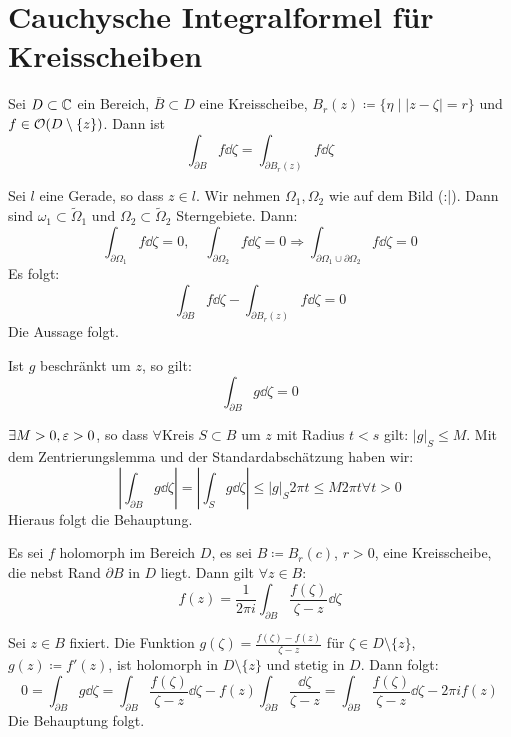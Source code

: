 \section{Cauchysche Integralformel f\"ur Kreisscheiben}
\begin{lemma}[Zentrierungslemma]
Sei $ D\subset\mathbb{C} $ ein Bereich, $ \bar B\subset D $ eine Kreisscheibe, $ B_r(z)\coloneqq\lbrace\eta\mid |z-\zeta|=r\rbrace $ und $ f\in\mathcal O(D\setminus\lbrace z\rbrace) $. Dann ist
\[ \int_{\partial B}^{} f\dd\zeta=\int_{\partial B_r(z)}^{} f\dd\zeta \]
\end{lemma}
\begin{beweis}
Sei $ l $ eine Gerade, so dass $ z\in l $. Wir nehmen $ \Omega_1,\Omega_2 $ wie auf dem Bild (:|). Dann sind $\omega_1\subset\tilde \Omega_1 $ und $ \Omega_2\subset\tilde{\Omega}_2 $ Sterngebiete.
Dann:
\[ \int_{\partial\Omega_1}^{} f\dd\zeta=0,\quad\int_{\partial\Omega_2}^{} f\dd\zeta = 0\Rightarrow\int_{\partial\Omega_1\cup\partial\Omega_2}^{} f\dd\zeta = 0 \]
Es folgt:
\[ \int_{\partial B}^{} f\dd\zeta - \int_{\partial B_r(z)}^{} f\dd\zeta = 0 \]
Die Aussage folgt.
\end{beweis}
\begin{korollar}
	Ist $ g $ beschr\"ankt um $ z $, so gilt:
	\[ \int_{\partial B}g\dd\zeta=0 \]
\end{korollar}
\begin{beweis}
	$ \exists M>0,\varepsilon>0 $, so dass $ \forall $Kreis $ S\subset B $ um $ z $ mit Radius $ t<s $ gilt: $ |g|_S\leq M $. Mit dem Zentrierungslemma und der Standardabsch\"atzung haben wir:
	\[ \left|\int_{\partial B}^{} g\dd\zeta\right|=\left|\int_S g\dd\zeta\right|\leq|g|_S2\pi t\leq M2\pi t\forall t>0 \]
	Hieraus folgt die Behauptung.
\end{beweis}
\newpage
\begin{satz}
	Es sei $ f $ holomorph im Bereich $ D $, es sei $ B\coloneqq B_r(c) $, $ r>0 $, eine Kreisscheibe, die nebst Rand $ \partial B $ in $ D $ liegt. Dann gilt $ \forall z\in B $:
	\[ f(z)=\frac{1}{2\pi i}\int_{\partial B}^{}\frac{f(\zeta)}{\zeta-z}\dd\zeta \]
\end{satz}
\begin{beweis}
	Sei $ z\in B $ fixiert. Die Funktion $ g(\zeta)=\frac{f(\zeta)-f(z)}{\zeta-z} $ f\"ur $ \zeta\in D\setminus\lbrace z\rbrace $, $ g(z)\coloneqq f'(z) $, ist holomorph in $ D\setminus\lbrace z\rbrace $ und stetig in $ D $. Dann folgt:
	\[ 0=\int_{\partial B}^{}g\dd\zeta=\int_{\partial B}^{}\frac{f(\zeta)}{\zeta-z}\dd\zeta-f(z)\int_{\partial B}^{}\frac{\dd\zeta}{\zeta-z}=\int_{\partial B}^{}\frac{f(\zeta)}{\zeta-z}\dd\zeta-2\pi if(z) \]
	Die Behauptung folgt.
\end{beweis}
